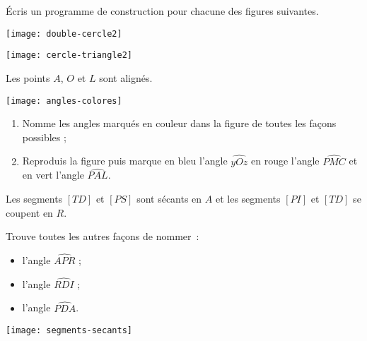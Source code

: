 \begin{exercice}
Écris un programme de construction pour chacune des figures suivantes.

\begin{colenumerate}{1}
 \item 
 
 \texttt{[image: double-cercle2]}
 \item 

\texttt{[image: cercle-triangle2]}
 \end{colenumerate}
\end{exercice}





\begin{exercice}
Les points $A$, $O$ et $L$ sont alignés.
 \begin{center} \texttt{[image: angles-colores]}  \end{center}
\begin{enumerate}
 \item Nomme les angles marqués en couleur dans la figure de toutes les façons possibles ; 
 \item Reproduis la figure puis marque en bleu l'angle $\widehat{yOz}$ en rouge l'angle $\widehat{PMC}$ et en vert l'angle $\widehat{PAL}$.
 \end{enumerate}
\end{exercice}


\begin{exercice}
Les segments $[TD]$ et $[PS]$ sont sécants en $A$ et les segments $[PI]$ et $[TD]$ se coupent en $R$.

Trouve toutes les autres façons de nommer : \\[0.5em]
\begin{minipage}[c]{0.2\textwidth}
\begin{itemize}
 \item l'angle $\widehat{APR}$ ;
 \item l'angle $\widehat{RDI}$ ;
 \item l'angle $\widehat{PDA}$.
 \end{itemize}
 \end{minipage} \hfill%
  \begin{minipage}[c]{0.4\textwidth}
  \texttt{[image: segments-secants]}
  \end{minipage} \\
\end{exercice}  


